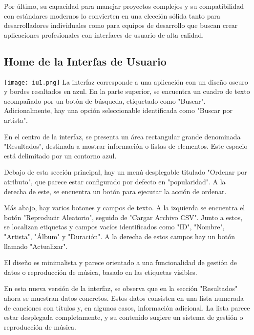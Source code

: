 \documentclass[corference]{IEEEtran}
\begin{document}
\begin{flushleft}
        \noindent\hspace*{4em}Por último, su capacidad para manejar proyectos complejos y su compatibilidad con estándares modernos lo convierten en una elección sólida tanto para desarrolladores individuales como para equipos de desarrollo que buscan crear aplicaciones profesionales con interfaces de usuario de alta calidad.

        \subsection{Home de la Interfas de Usuario}
            \texttt{[image: iu1.png]}
            \noindent\hspace*{4em}La interfaz corresponde a una aplicación con un diseño oscuro y bordes resaltados en azul. En la parte superior, se encuentra un cuadro de texto acompañado por un botón de búsqueda, etiquetado como "Buscar". Adicionalmente, hay una opción seleccionable identificada como "Buscar por artista". 
            
            \noindent\hspace*{4em}En el centro de la interfaz, se presenta un área rectangular grande denominada "Resultados", destinada a mostrar información o listas de elementos. Este espacio está delimitado por un contorno azul.
            
            \noindent\hspace*{4em}Debajo de esta sección principal, hay un menú desplegable titulado "Ordenar por atributo", que parece estar configurado por defecto en "popularidad". A la derecha de este, se encuentra un botón para ejecutar la acción de ordenar.
            
            \noindent\hspace*{4em}Más abajo, hay varios botones y campos de texto. A la izquierda se encuentra el botón "Reproducir Aleatorio", seguido de "Cargar Archivo CSV". Junto a estos, se localizan etiquetas y campos vacíos identificados como "ID", "Nombre", "Artista", "Álbum" y "Duración". A la derecha de estos campos hay un botón llamado "Actualizar".
            
            \noindent\hspace*{4em}El diseño es minimalista y parece orientado a una funcionalidad de gestión de datos o reproducción de música, basado en las etiquetas visibles.

            \noindent\hspace*{4em}En esta nueva versión de la interfaz, se observa que en la sección "Resultados" ahora se muestran datos concretos. Estos datos consisten en una lista numerada de canciones con títulos y, en algunos casos, información adicional. La lista parece estar desplegada completamente, y su contenido sugiere un sistema de gestión o reproducción de música.


\end{flushleft}
\end{document}
